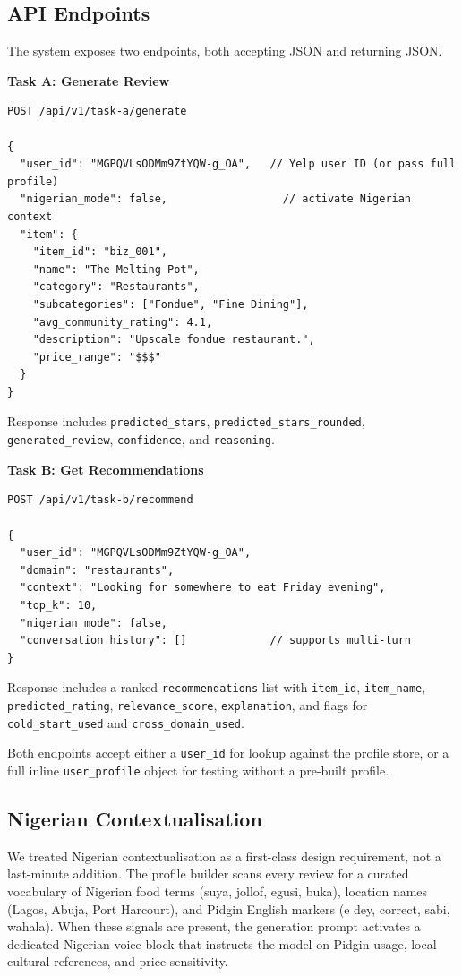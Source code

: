 \documentclass[11pt,a4paper]{article}
\begin{document}
\subsection{API Endpoints}

The system exposes two endpoints, both accepting JSON and returning JSON.

\textbf{Task A: Generate Review}

\begin{verbatim}
POST /api/v1/task-a/generate

{
  "user_id": "MGPQVLsODMm9ZtYQW-g_OA",   // Yelp user ID (or pass full profile)
  "nigerian_mode": false,                  // activate Nigerian context
  "item": {
    "item_id": "biz_001",
    "name": "The Melting Pot",
    "category": "Restaurants",
    "subcategories": ["Fondue", "Fine Dining"],
    "avg_community_rating": 4.1,
    "description": "Upscale fondue restaurant.",
    "price_range": "$$$"
  }
}
\end{verbatim}

Response includes \texttt{predicted\_stars}, \texttt{predicted\_stars\_rounded},
\texttt{generated\_review}, \texttt{confidence}, and \texttt{reasoning}.



\textbf{Task B: Get Recommendations}

\begin{verbatim}
POST /api/v1/task-b/recommend

{
  "user_id": "MGPQVLsODMm9ZtYQW-g_OA",
  "domain": "restaurants",
  "context": "Looking for somewhere to eat Friday evening",
  "top_k": 10,
  "nigerian_mode": false,
  "conversation_history": []             // supports multi-turn
}
\end{verbatim}

Response includes a ranked \texttt{recommendations} list with
\texttt{item\_id}, \texttt{item\_name}, \texttt{predicted\_rating},
\texttt{relevance\_score}, \texttt{explanation}, and flags for
\texttt{cold\_start\_used} and \texttt{cross\_domain\_used}.

Both endpoints accept either a \texttt{user\_id} for lookup against the
profile store, or a full inline \texttt{user\_profile} object for testing
without a pre-built profile.

\subsection{Nigerian Contextualisation}

We treated Nigerian contextualisation as a first-class design requirement,
not a last-minute addition. The profile builder scans every review for a
curated vocabulary of Nigerian food terms (suya, jollof, egusi, buka),
location names (Lagos, Abuja, Port Harcourt), and Pidgin English markers
(e dey, correct, sabi, wahala). When these signals are present, the
generation prompt activates a dedicated Nigerian voice block that instructs
the model on Pidgin usage, local cultural references, and price sensitivity.
\end{document}
